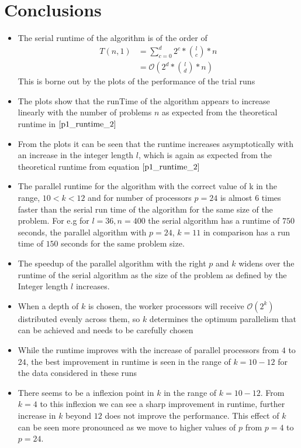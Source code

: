 \documentclass[twoside,11pt]{article}\usepackage{amsmath,amsfonts,amsthm,fullpage}
\begin{document}
\section{Conclusions}
\begin{itemize}
\item
The serial runtime of the algorithm is of the order of
\begin{align}
T(n,1) &= \sum_{c=0}^{d} 2^c *{l\choose c} * n\nonumber\\
&=\mathcal{O}( 2^d *{l\choose d} * n ) \label{p1_runtime_2}
\end{align}
This is borne out by the plots of the performance of the trial runs
\item
The plots show that the runTime of the algorithm appears to increase linearly with the number of problems $n$ as expected from the theoretical runtime in $\eqref{p1_runtime_2}$
\item
From the plots it can be seen that the runtime increases asymptotically with an increase in the integer length $l$, which is again as expected from the theoretical runtime from equation $\eqref{p1_runtime_2}$
\item
The parallel runtime for the algorithm with the correct value of  k in the range, $10<k<12$ and for number of processors $p=24$ is almost 6 times faster than the serial run time of the algorithm for the same size of the problem. For e.g for $l=36,n=400$ the serial algorithm has a runtime of $750$ seconds, the parallel algorithm with $p=24$, $k=11$ in comparison has a run time of $150$ seconds for the same problem size.
\item
The speedup of the parallel algorithm with the right $p$ and $k$ widens over the runtime of the serial algorithm as the size of the problem as defined by the Integer length $l$ increases.
\item
When a depth of $k$ is chosen, the worker processors will receive $\mathcal{O}(2^k)$ distributed evenly across them, so $k$ determines the optimum parallelism that can be achieved and needs to be carefully chosen
\item
While the runtime improves with the increase of parallel processors from $4$ to $24$, the best improvement in runtime is seen in the range of $k=10-12$ for the data considered in these runs
\item
There seems to be a inflexion point in $k$ in the range of $k=10-12$. From $k=4$ to this inflexion we can see a sharp improvement in runtime, further increase in $k$ beyond $12$ does not improve the performance. This effect of $k$ can be seen more pronounced as we move to higher values of $p$ from $p=4$ to $p=24$. 

\end{itemize}
\end{document}
